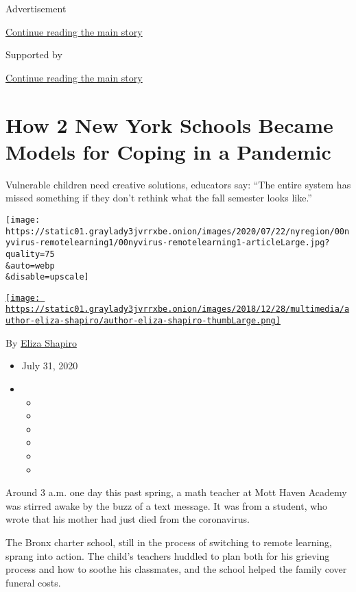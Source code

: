 Advertisement

\protect\hyperlink{after-top}{Continue reading the main story}

Supported by

\protect\hyperlink{after-sponsor}{Continue reading the main story}

\hypertarget{how-2-new-york-schools-became-models-for-coping-in-a-pandemic}{%
\section{How 2 New York Schools Became Models for Coping in a
Pandemic}\label{how-2-new-york-schools-became-models-for-coping-in-a-pandemic}}

Vulnerable children need creative solutions, educators say: ``The entire
system has missed something if they don't rethink what the fall semester
looks like.''

\texttt{[image: https://static01.graylady3jvrrxbe.onion/images/2020/07/22/nyregion/00nyvirus-remotelearning1/00nyvirus-remotelearning1-articleLarge.jpg?quality=75\\\&auto=webp\\\&disable=upscale]}

\href{https://www.nytimes3xbfgragh.onion/by/eliza-shapiro}{\texttt{[image: https://static01.graylady3jvrrxbe.onion/images/2018/12/28/multimedia/author-eliza-shapiro/author-eliza-shapiro-thumbLarge.png]}}

By \href{https://www.nytimes3xbfgragh.onion/by/eliza-shapiro}{Eliza
Shapiro}

\begin{itemize}
\item
  July 31, 2020
\item
  \begin{itemize}
  \item
  \item
  \item
  \item
  \item
  \item
  \end{itemize}
\end{itemize}

Around 3 a.m. one day this past spring, a math teacher at Mott Haven
Academy was stirred awake by the buzz of a text message. It was from a
student, who wrote that his mother had just died from the coronavirus.

The Bronx charter school, still in the process of switching to remote
learning, sprang into action. The child's teachers huddled to plan both
for his grieving process and how to soothe his classmates, and the
school helped the family cover funeral costs.

